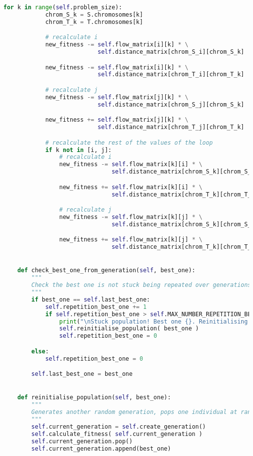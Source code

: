\begin{lstlisting}[language=python]
        for k in range(self.problem_size):
            chrom_S_k = S.chromosomes[k]
            chrom_T_k = T.chromosomes[k]

            # recalculate i
            new_fitness -= self.flow_matrix[i][k] * \
                           self.distance_matrix[chrom_S_i][chrom_S_k]

            new_fitness -= self.flow_matrix[i][k] * \
                           self.distance_matrix[chrom_T_i][chrom_T_k]

            # recalculate j
            new_fitness -= self.flow_matrix[j][k] * \
                           self.distance_matrix[chrom_S_j][chrom_S_k]

            new_fitness += self.flow_matrix[j][k] * \
                           self.distance_matrix[chrom_T_j][chrom_T_k]

            # recalculate the rest of the values of the loop
            if k not in [i, j]:
                # recalculate i
                new_fitness -= self.flow_matrix[k][i] * \
                               self.distance_matrix[chrom_S_k][chrom_S_i]

                new_fitness += self.flow_matrix[k][i] * \
                               self.distance_matrix[chrom_T_k][chrom_T_i]

                # recalculate j
                new_fitness -= self.flow_matrix[k][j] * \
                               self.distance_matrix[chrom_S_k][chrom_S_j]

                new_fitness += self.flow_matrix[k][j] * \
                               self.distance_matrix[chrom_T_k][chrom_T_j]


    def check_best_one_from_generation(self, best_one):
        """
        Check the best one is not stuck being repeated over generations. Otherwise, reinitialise the population keeping the best one
        """
        if best_one == self.last_best_one:
            self.repetition_best_one += 1
            if self.repetition_best_one > self.MAX_NUMBER_REPETITION_BEST_ONE:
                print("\nStuck population! Best one {}. Reinitialising...".format(best_one.fitness))
                self.reinitialise_population( best_one )
                self.repetition_best_one = 0

        else:
            self.repetition_best_one = 0

        self.last_best_one = best_one


    def reinitialise_population(self, best_one):
        """
        Generates another random generation, pops one individual at random and inserts the best one from the previous generation
        """
        self.current_generation = self.create_generation()
        self.calculate_fitness( self.current_generation )
        self.current_generation.pop()
        self.current_generation.append(best_one)



\end{lstlisting}
